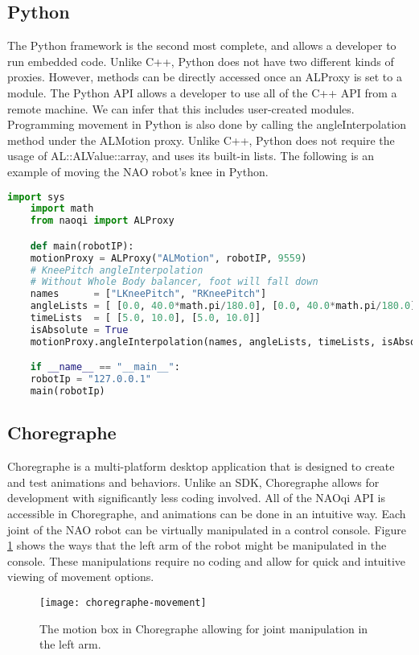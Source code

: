 \subsection{Python}
The Python framework is the second most complete, and allows a developer to run embedded code.
Unlike C++, Python does not have two different kinds of proxies.
However, methods can be directly accessed once an ALProxy is set to a module.
The Python API allows a developer to use all of the C++ API from a remote machine.
We can infer that this includes user-created modules.
Programming movement in Python is also done by calling the angleInterpolation method under the ALMotion proxy.
Unlike C++, Python does not require the usage of AL::ALValue::array, and uses its built-in lists.
The following is an example of moving the NAO robot's knee in Python. \cite{NAOSDK:Python}
\begin{lstlisting}[language=Python]
	import sys
	import math
	from naoqi import ALProxy

	def main(robotIP):
    motionProxy = ALProxy("ALMotion", robotIP, 9559)
    # KneePitch angleInterpolation
    # Without Whole Body balancer, foot will fall down
    names      = ["LKneePitch", "RKneePitch"]
    angleLists = [ [0.0, 40.0*math.pi/180.0], [0.0, 40.0*math.pi/180.0]]
    timeLists  = [ [5.0, 10.0], [5.0, 10.0]]
    isAbsolute = True
    motionProxy.angleInterpolation(names, angleLists, timeLists, isAbsolute)

	if __name__ == "__main__":
    robotIp = "127.0.0.1"
    main(robotIp)

\end{lstlisting}

\subsection{Choregraphe}
Choregraphe is a multi-platform desktop application that is designed to create and test animations and behaviors.
Unlike an SDK, Choregraphe allows for development with significantly less coding involved.
All of the NAOqi API is accessible in Choregraphe, and animations can be done in an intuitive way.
Each joint of the NAO robot can be virtually manipulated in a control console. Figure \ref{fig:choregraphe-movement} shows the ways that the left arm of the robot might be manipulated in the console.
These manipulations require no coding and allow for quick and intuitive viewing of movement options.

\begin{figure}[H]
	\centering
	\texttt{[image: choregraphe-movement]}
	\caption{The motion box in Choregraphe allowing for joint manipulation in the left arm.}
	\label{fig:choregraphe-movement}
\end{figure}

